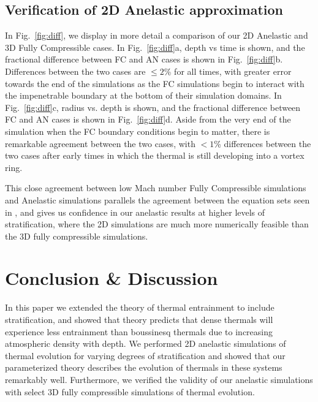 \documentclass[twocolumn, amsmath, amsfonts, amssymb, trackchanges]{aastex62}
\begin{document}
\subsection{Verification of 2D Anelastic approximation}
In Fig.~\ref{fig:diff}, we display in more detail a comparison of our 2D Anelastic and 3D Fully Compressible cases. 
In Fig.~\ref{fig:diff}a, depth vs time is shown, and the fractional difference between FC and AN cases is shown in Fig.~\ref{fig:diff}b.
Differences between the two cases are $\leq 2$\% for all times, with greater error towards the end of the simulations as the FC simulations begin to interact with the impenetrable boundary at the bottom of their simulation domains.  
In Fig.~\ref{fig:diff}c, radius vs. depth is shown, and the fractional difference between FC and AN cases is shown in Fig.~\ref{fig:diff}d. 
Aside from the very end of the simulation when the FC boundary conditions begin to matter, there is remarkable agreement between the two cases, with $< 1$\% differences between the two cases after early times in which the thermal is still developing into a vortex ring.

This close agreement between low Mach number Fully Compressible simulations and Anelastic simulations parallels the agreement between the equation sets seen in \citet{lecoanet&all2014}, and gives us confidence in our anelastic results at higher levels of stratification, where the 2D simulations are much more numerically feasible than the 3D fully compressible simulations.


\section{Conclusion \& Discussion}
\label{sec:discussion}
In this paper we extended the theory of thermal entrainment to include stratification, and showed that theory predicts that dense thermals will experience less entrainment than boussinesq thermals due to increasing atmospheric density with depth.
We performed 2D anelastic simulations of thermal evolution for varying degrees of stratification and showed that our parameterized theory describes the evolution of thermals in these systems remarkably well.
Furthermore, we verified the validity of our anelastic simulations with select 3D fully compressible simulations of thermal evolution.
\end{document}
